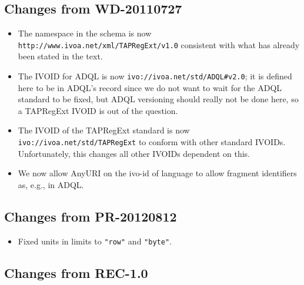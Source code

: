 \documentclass{ivoa}
\begin{document}
\subsection{Changes from WD-20110727}

\label{changes-20110727}

\begin{itemize}

\item The namespace in the schema is now \nolinkurl{http://www.ivoa.net/xml/TAPRegExt/v1.0} consistent with what has already been stated in the text.{}

\item The IVOID for ADQL is now
\nolinkurl{ivo://ivoa.net/std/ADQL\#v2.0}; it is defined here to be in
ADQL's record since we do not want to wait for the ADQL standard to be
fixed, but ADQL versioning should really not be done here, so a
TAPRegExt IVOID is out of the question.{}

\item The IVOID of the TAPRegExt standard is now
\texttt{ivo://ivoa.net/std/TAPRegExt} to conform with other standard
IVOIDs.  Unfortunately, this changes
all other IVOIDs dependent on this.{}

\item We now allow AnyURI on the ivo-id of language to allow fragment identifiers as, e.g., in ADQL.{}

\end{itemize}


\subsection{Changes from PR-20120812}

\label{changes-20120208}

\begin{itemize}

\item Fixed units in limits to \verb|"row"| and \verb|"byte"|.

\end{itemize}

\subsection{Changes from REC-1.0}

\label{changes-rec-1.0}
\end{document}
